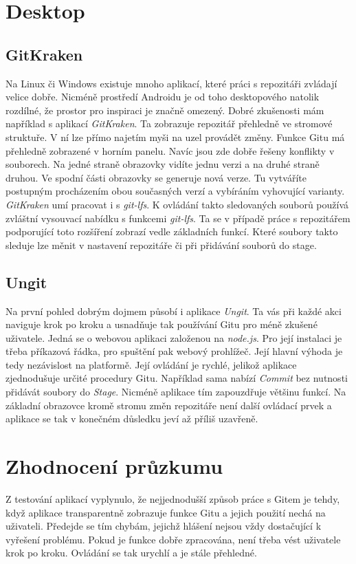     \section {Desktop}
    \subsection{GitKraken}
    Na Linux či Windows existuje mnoho aplikací, které práci s repozitáři zvládají velice dobře. Nicméně prostředí Androidu je od toho desktopového natolik rozdílné, že prostor pro inspiraci je značně omezený. Dobré zkušenosti mám například s aplikací \emph{GitKraken}. Ta zobrazuje repozitář přehledně ve stromové struktuře. V ní lze přímo najetím myši na uzel provádět změny. Funkce Gitu má přehledně zobrazené v horním panelu. Navíc jsou zde dobře řešeny konflikty v souborech. Na jedné straně obrazovky vidíte jednu verzi a na druhé straně druhou. Ve spodní části obrazovky se generuje nová verze. Tu vytváříte postupným procházením obou současných verzí a vybíráním vyhovující varianty. \emph{GitKraken} umí pracovat i s \emph{git-lfs}. K ovládání takto sledovaných souborů používá zvláštní vysouvací nabídku s funkcemi \emph{git-lfs}. Ta se v případě práce s repozitářem podporující toto rozšíření zobrazí vedle základních funkcí. Které soubory takto sleduje lze měnit v nastavení repozitáře či při přidávání souborů do stage.

    \subsection{Ungit}
    Na první pohled dobrým dojmem působí i aplikace \emph{Ungit}. Ta vás při každé akci naviguje krok po kroku a usnadňuje tak používání Gitu pro méně zkušené uživatele. Jedná se o webovou aplikaci založenou na \emph{node.js}. Pro její instalaci je třeba příkazová řádka, pro spuštění pak webový prohlížeč. Její hlavní výhoda je tedy nezávislost na platformě. Její ovládání je rychlé, jelikož aplikace zjednodušuje určité procedury Gitu. Například sama nabízí \emph{Commit} bez nutnosti přidávát soubory do \emph{Stage}. Nicméně aplikace tím zapouzdřuje většinu funkcí. Na základní obrazovce kromě stromu změn repozitáře není další ovládací prvek a aplikace se tak v konečném důsledku jeví až příliš uzavřeně.

    \section{Zhodnocení průzkumu}
    Z testování aplikací vyplynulo, že nejjednodušší způsob práce s Gitem je tehdy, když aplikace transparentně zobrazuje funkce Gitu a jejich použití nechá na uživateli. Předejde se tím chybám, jejichž hlášení nejsou vždy dostačující k vyřešení problému. Pokud je funkce dobře zpracována, není třeba vést uživatele krok po kroku. Ovládání se tak urychlí a je stále přehledné.


